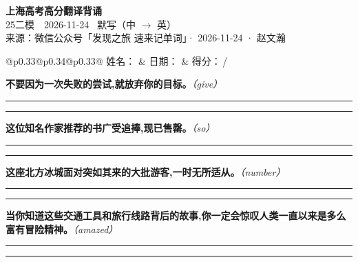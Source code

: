 \documentclass[11pt,a4paper]{article}
\newcommand{\num}[1]{\makebox[1.9em][r]{#1.}\hspace{0.3em}}
\newcommand{\wline}{\noindent\rule{\linewidth}{0.4pt}}
\newcommand{\prompt}[1]{\emph{\textcolor{tipblue}{\small（#1）}}}
\begin{document}
\pagestyle{plain}
\begin{center}
{\LARGE\bfseries 上海高考高分翻译背诵 }\\[0.25em]
{\large 25二模　2026-11-24 \quad\ 默写（中 $\to$ 英）}\\[0.35em]
{\footnotesize 来源：微信公众号「发现之旅 速来记单词」· 2026-11-24 · 赵文瀚}
\end{center}

\vspace{0.4em}
\noindent\begin{tabular}{@{}p{0.33\textwidth}@{}p{0.34\textwidth}@{}p{0.33\textwidth}@{}}
姓名：\underline{\hspace{2.0cm}} & 日期：\underline{\hspace{2.0cm}} & 得分：\underline{\hspace{1.4cm}}\,/ \\
\end{tabular}

\vspace{0.5em}

\vspace{0.8em}
\num{1}\textbf{不要因为一次失败的尝试,就放弃你的目标。}\prompt{give}

\vspace{0.3em}

\wline\vspace{0.3em}
\wline

\num{2}\textbf{这位知名作家推荐的书广受追捧,现已售罄。}\prompt{so}

\vspace{0.3em}

\wline\vspace{0.3em}
\wline

\num{3}\textbf{这座北方冰城面对突如其来的大批游客,一时无所适从。}\prompt{number}

\vspace{0.3em}

\wline\vspace{0.3em}
\wline

\num{4}\textbf{当你知道这些交通工具和旅行线路背后的故事,你一定会惊叹人类一直以来是多么富有冒险精神。}\prompt{amazed}

\vspace{0.3em}

\wline\vspace{0.3em}
\wline
\end{document}
